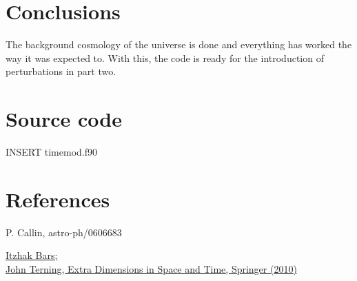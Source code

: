 \documentclass{aa}   %
\begin{document}
\section{Conclusions} \label{sec:conclusions}
The background cosmology of the universe is done and everything has worked the way it was expected to.
With this, the code is ready for the introduction of perturbations in part two.
\section{Source code}\label{sec:files}
INSERT timemod.f90

\section{References}
\begin{thebibliography}{9}
P. Callin, astro-ph/0606683

\href{https://books.google.no/books?id=fFSMatekilIC&pg=PA27&hl=en#v=onepage&q&f=false}{Itzhak Bars; \\John Terning, Extra Dimensions in Space and Time, Springer (2010)}
\end{thebibliography}

\end{document}
